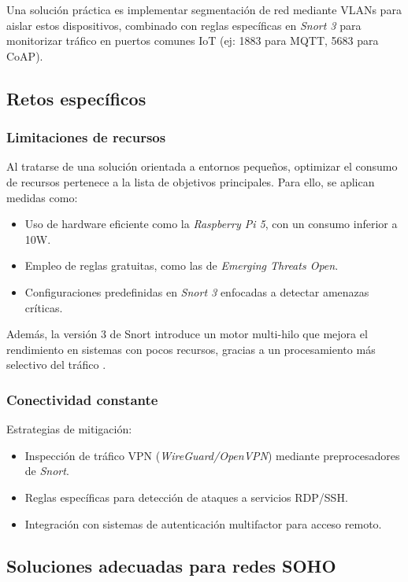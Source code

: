 \documentclass[11pt,a4paper,twoside]{report}
\begin{document}
Una solución práctica es implementar segmentación de red mediante VLANs para aislar estos dispositivos, combinado con reglas específicas en \textit{Snort 3} para monitorizar tráfico en puertos comunes IoT (ej: 1883 para MQTT, 5683 para CoAP).

\subsection{Retos específicos}

\subsubsection{Limitaciones de recursos}

Al tratarse de una solución orientada a entornos pequeños, optimizar el consumo de recursos pertenece a la lista de objetivos principales. Para ello, se aplican medidas como:

\begin{itemize}
	\item Uso de hardware eficiente como la \textit{Raspberry Pi 5}, con un consumo inferior a 10W.
	\item Empleo de reglas gratuitas, como las de \textit{Emerging Threats Open}.
	\item Configuraciones predefinidas en \textit{Snort 3} enfocadas a detectar amenazas críticas.
\end{itemize}

Además, la versión 3 de Snort introduce un motor multi-hilo que mejora el rendimiento en sistemas con pocos recursos, gracias a un procesamiento más selectivo del tráfico \cite{park2017performance}.


\subsubsection{Conectividad constante}
Estrategias de mitigación:
\begin{itemize}
	\item Inspección de tráfico VPN (\textit{WireGuard/OpenVPN}) mediante preprocesadores de \textit{Snort}.
	\item Reglas específicas para detección de ataques a servicios RDP/SSH.
	\item Integración con sistemas de autenticación multifactor para acceso remoto.
\end{itemize}

\subsection{Soluciones adecuadas para redes SOHO}
\end{document}
